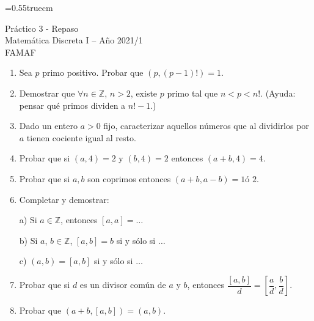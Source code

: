 \documentclass[a4paper,12pt,twoside,spanish,reqno]{amsbook}
\numberwithin{equation}{section}
\begin{document}
    \baselineskip=0.55truecm %
    

{\bf \begin{center} Práctico 3 - Repaso \\ Matemática Discreta I -- Año 2021/1 \\ FAMAF\end{center}}




\begin{enumerate}
\setlength\itemsep{1.1em}

\item Sea $p$ primo positivo. Probar que $(p,(p-1)!)=1$.



\item Demostrar que $\forall n\in{\mathbb Z}$, $n>2$, existe $p$ primo tal que $n<p<n!$. (Ayuda: pensar qu\'e primos dividen a $n! - 1$.)





\item Dado un entero $a>0$ fijo, caracterizar aquellos n\'umeros que al dividirlos por $a$ tienen cociente igual al resto.




\item Probar que si $(a,4)=2$ y $(b,4)=2$ entonces $(a+b,4)=4$.


\item Probar que si $a,b$ son coprimos entonces $(a+b,a-b)=1 \text{
\'o } 2 $.







\item Completar y demostrar:

a) Si $a \in {\mathbb Z}$, entonces $[a,a]=\dots$

b) Si $a$, $b \in {\mathbb Z}$, $[a,b]=b$ si y s\'olo si $\ldots$

c) $(a,b)=[a,b]$ si y s\'olo si $\ldots$




\item Probar que si $d$ es un divisor com\'un de $a$ y $b$, entonces $\dfrac{[a,b]}{d} = \left[\dfrac{a}{d},\dfrac{b}{d}\right]$.





\item Probar que $(a+b,[a,b])=(a,b)$. %




\end{enumerate}
\end{document}
